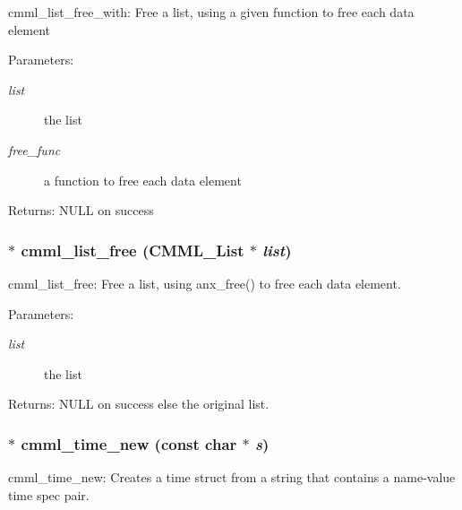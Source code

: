 cmml\_\-list\_\-free\_\-with: Free a list, using a given function to free each data element

\begin{Desc}
\item[Parameters:]
\begin{description}
\item[{\em list}]the list \item[{\em free\_\-func}]a function to free each data element\end{description}
\end{Desc}
\begin{Desc}
\item[Returns:]NULL on success \end{Desc}
\subsubsection{$\ast$ cmml\_\-list\_\-free ({\bf CMML\_\-List} $\ast$ {\em list})}\label{cmml_8h_a96}


cmml\_\-list\_\-free: Free a list, using anx\_\-free() to free each data element.

\begin{Desc}
\item[Parameters:]
\begin{description}
\item[{\em list}]the list\end{description}
\end{Desc}
\begin{Desc}
\item[Returns:]NULL on success else the original list. \end{Desc}
\subsubsection{$\ast$ cmml\_\-time\_\-new (const char $\ast$ {\em s})}\label{cmml_8h_a97}


cmml\_\-time\_\-new: Creates a time struct from a string that contains a name-value time spec pair.

